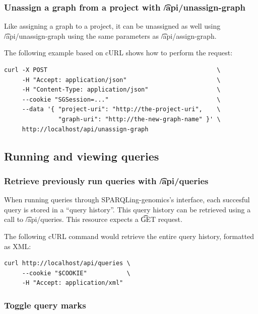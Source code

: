 \subsubsection{Unassign a graph from a project with \t{/api/unassign-graph}}

  Like assigning a graph to a project, it can be unassigned as well using
  \t{/api/unassign-graph} using the same parameters as
  \t{/api/assign-graph}.

  The following example based on cURL shows how to perform the request:
\begin{siderules}
\begin{verbatim}
curl -X POST                                               \
     -H "Accept: application/json"                         \
     -H "Content-Type: application/json"                   \
     --cookie "SGSession=..."                              \
     --data '{ "project-uri": "http://the-project-uri",    \
               "graph-uri": "http://the-new-graph-name" }' \
     http://localhost/api/unassign-graph
\end{verbatim}
\end{siderules}

\subsection{Running and viewing queries}

\subsubsection{Retrieve previously run queries with \t{/api/queries}}

  When running queries through SPARQLing-genomics's interface, each succesful
  query is stored in a ``query history''.  This query history can be retrieved
  using a call to \t{/api/queries}.  This resource expects a \t{GET}
  request.

  The following cURL command would retrieve the entire query history, formatted
  as XML:

\begin{siderules}
\begin{verbatim}
curl http://localhost/api/queries \
     --cookie "$COOKIE"           \
     -H "Accept: application/xml"
\end{verbatim}
\end{siderules}

\subsubsection{Toggle query marks}

